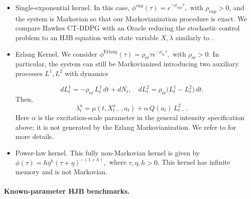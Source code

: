 \documentclass[11pt]{article}
\theoremstyle{remarkitalic}
\theoremstyle{remarkitalic}
\newcommand{\1}{\mathbf 1}
\begin{document}
\begin{itemize}
    \item Single-exponential kernel. In this case, $\phi^{\exp}(\tau)=e^{-\rho_{\mathrm{exp}}\tau},$ with $\rho_{\mathrm{exp}}>0$, and the system is Markovian so that our Markovianization procedure is exact. We compare Hawkes CT-DDPG with an Oracle reducing the stochastic control problem to an HJB equation with state variable $X,\lambda$ similarly to \cite{Bensoussan2024,callegaro2025stochastic}.
    \item Erlang Kernel. We consider $\phi^{\mathrm{Erlang}}(\tau)=\rho_{\mathrm{er}}\tau e^{-\rho_\mathrm{er}\tau},$ with $\rho_\mathrm{er}>0.$
    In particular, the system can still be Markovianized introducing two auxiliary processes $ L^1, L^2$ with dynamics

     \[dL^1_t = -\rho_\mathrm{er}\, L^1_t\,dt + dN_t,\quad  dL^2_t = \rho_\mathrm{er}\bigl(L^1_t - L^2_t\bigr)\,dt.\]
Then,
\[ \lambda^{a}_t = \mu(t,X_{t-}^a,a_t) + \alpha\,Q(a_t)\,L^2_{t-}.\]
Here \(\alpha\) is the excitation-scale parameter in the general intensity
specification above; it is not generated by the Erlang Markovianization.
We refer to  \cite{duarte2019stability} for more details. 
\item Power-law kernel. This fully non-Markovian kernel is given by $\phi(\tau) = h\eta^h(\tau+\eta)^{-(1+h)},$
where $\tau, \eta, h>0.$ This kernel has infinite memory and is not Markovian.
\end{itemize} \paragraph{Known-parameter HJB benchmarks.}
\end{document}
